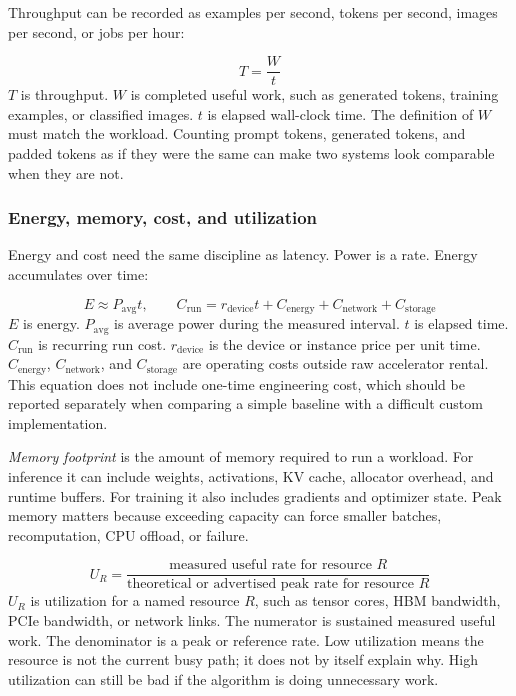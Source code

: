 Throughput can be recorded as examples per second, tokens per second, images per second, or jobs per hour:

\begin{keyequation}[Throughput]
\[
  T =
  \frac{W}{t}
\]
\tcblower
\(T\) is throughput. \(W\) is completed useful work, such as generated tokens, training examples, or classified images. \(t\) is elapsed wall-clock time. The definition of \(W\) must match the workload. Counting prompt tokens, generated tokens, and padded tokens as if they were the same can make two systems look comparable when they are not.
\end{keyequation}

\subsubsection{Energy, memory, cost, and utilization}

Energy and cost need the same discipline as latency. Power is a rate. Energy accumulates over time:

\begin{keyequation}
\[
  E \approx P_{\text{avg}} t,
  \qquad
  C_{\text{run}} =
  r_{\text{device}} t + C_{\text{energy}} + C_{\text{network}} + C_{\text{storage}}
\]
\tcblower
\(E\) is energy. \(P_{\text{avg}}\) is average power during the measured interval. \(t\) is elapsed time. \(C_{\text{run}}\) is recurring run cost. \(r_{\text{device}}\) is the device or instance price per unit time. \(C_{\text{energy}}\), \(C_{\text{network}}\), and \(C_{\text{storage}}\) are operating costs outside raw accelerator rental. This equation does not include one-time engineering cost, which should be reported separately when comparing a simple baseline with a difficult custom implementation.
\end{keyequation}

\emph{Memory footprint} is the amount of memory required to run a workload. For inference it can include weights, activations, KV cache, allocator overhead, and runtime buffers. For training it also includes gradients and optimizer state. Peak memory matters because exceeding capacity can force smaller batches, recomputation, CPU offload, or failure.

\begin{keyequation}[Utilization]
\[
  U_R =
  \frac{\text{measured useful rate for resource } R}
       {\text{theoretical or advertised peak rate for resource } R}
\]
\tcblower
\(U_R\) is utilization for a named resource \(R\), such as tensor cores, HBM bandwidth, PCIe bandwidth, or network links. The numerator is sustained measured useful work. The denominator is a peak or reference rate. Low utilization means the resource is not the current busy path; it does not by itself explain why. High utilization can still be bad if the algorithm is doing unnecessary work.
\end{keyequation}

